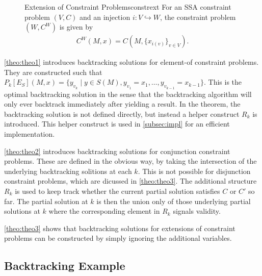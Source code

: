 \begin{figure}[p]
    \begin{definition}{Extension of Constraint Problems}{constrext}
        For an SSA constraint problem $(V,C)$ and an injection
        $i:V\hookrightarrow W$, the constraint problem $(W,C^W)$ is given by
        \begin{align*}
            C^W(M,x)=C(M,\{x_{i(v)}\}_{v\in V}).
        \end{align*}
    \end{definition}
\end{figure}

\begin{figure}[p]
    
\end{figure}

\begin{figure}[p]
    
\end{figure}

    \autoref{theo:theo1} introduces backtracking solutions for element-of
    constraint problems.
    They are constructed such that
    $P_k[E_S](M,x)=\{y_{v_k}\mid y\in S(M), y_{v_1}=x_1,\dots,y_{v_{k-1}}=x_{k-1}\}$.
    This is the optimal backtracking solution in the sense that the backtracking
    algorithm will only ever backtrack immediately after yielding a result.
    In the theorem, the backtracking solution is not defined directly, but
    instead a helper construct $R_k$ is introduced.
    This helper construct is used in \autoref{subsec:impl} for an efficient
    implementation.

    \autoref{theo:theo2} introduces backtracking solutions for conjunction
    constraint problems.
    These are defined in the obvious way, by taking the intersection of
    the underlying backtracking solitions at each $k$.
    This is not possible for disjunction constraint problems, which are dicussed
    in \autoref{theo:theo3}.
    The additional structure $R_k$ is used to keep track whether the current
    partial solution satisfies $C$ or $C'$ so far.
    The partial solution at $k$ is then the union only of those underlying
    partial solutions at $k$ where the corresponding element in $R_k$
    signals validity.

    \autoref{theo:theo3} shows that backtracking solutions for extensions of
    constraint problems can be constructed by simply ignoring the additional
    variables.

\subsection{Backtracking Example}

